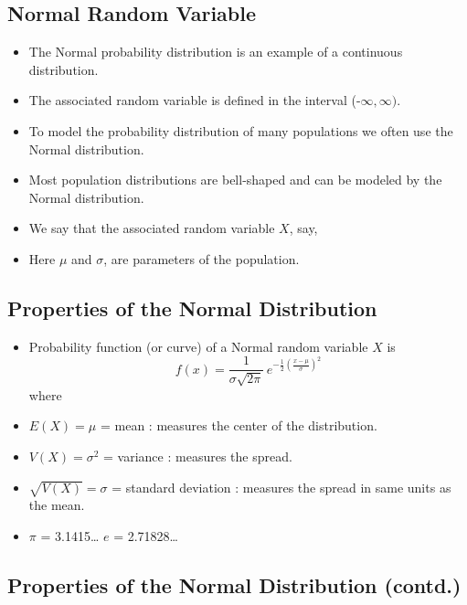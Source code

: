 \documentclass[
  letterpaper,
  DIV=11,
  numbers=noendperiod]{scrartcl}
\begin{document}
\subsection{Normal Random Variable}\label{normal-random-variable}

\begin{itemize}
\item
  The {Normal probability distribution} is an example of a continuous
  distribution.
\item
  The associated random variable is defined in the interval
  (-\(\infty,\infty)\).
\item
  To model the probability distribution of many populations we often use
  the Normal distribution.
\item
  Most population {distributions} are bell-shaped and can be modeled by
  the Normal distribution.
\item
  We say that the associated {random variable} \(X\), say,\\
\item
  Here \(\mu\) and \(\sigma\), are {parameters} of the population.
\end{itemize}

\subsection{Properties of the Normal
Distribution}\label{properties-of-the-normal-distribution}

\begin{itemize}
\item
  Probability function (or curve) of a Normal random variable \(X\) is
  \[\begin{equation*}
    f(x) = \frac{1}{\sigma \sqrt{2\pi}} \, e^{- \frac{1}{2} \left(\frac{x-\mu}{\sigma}\right)^2}
  \end{equation*}\] where
\item
  \(E(X)= \mu\) = mean : measures the {center of the distribution}.
\item
  \(V(X)= \sigma^2\) = variance : {measures the spread}.
\item
  \(\sqrt{V(X)}= \sigma\) = standard deviation : {measures the spread in
  same units as the mean}.
\item
  \(\pi\) = 3.1415\ldots{} \(e\) = 2.71828\ldots{}
\end{itemize}

\subsection{Properties of the Normal Distribution
(contd.)}\label{properties-of-the-normal-distribution-contd.}
\end{document}
